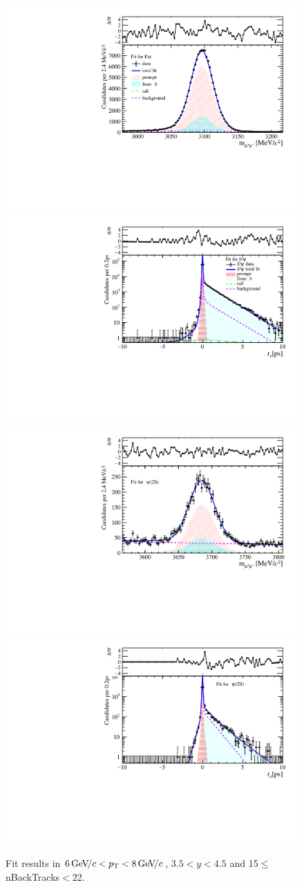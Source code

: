 \begin{figure}[H]
\begin{center}
\includegraphics[width=0.47\linewidth]{pdf/Jpsi/drawmassB/n3y3pt4.pdf}
\includegraphics[width=0.47\linewidth]{pdf/Jpsi/2DFitB/n3y3pt4.pdf}
\vspace*{-0.5cm}
\includegraphics[width=0.47\linewidth]{pdf/Psi2S/drawmassB/n3y3pt4.pdf}
\includegraphics[width=0.47\linewidth]{pdf/Psi2S/2DFitB/n3y3pt4.pdf}
\vspace*{-0.5cm}
\end{center}
\caption{Fit results in $6\text{\,Ge\kern -0.1em V\!/}c<p_{\mathrm{T}}<8\text{\,Ge\kern -0.1em V\!/}c$, $3.5<y<4.5$ and 15$\leq$nBackTracks$<$22.}
\label{Fitn3y3pt4}
\end{figure}
